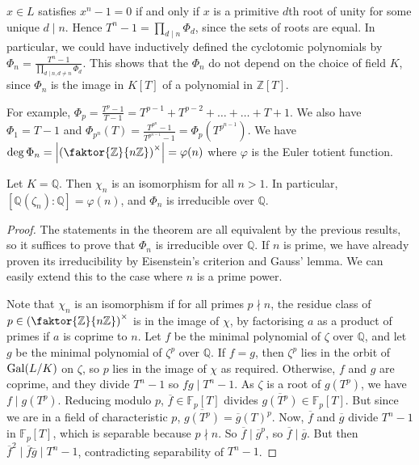 \( x \in L \) satisfies \( x^n - 1 = 0 \) if and only if \( x \) is a primitive \( d \)th root of unity for some unique \( d \mid n \).
Hence \( T^n - 1 = \prod_{d \mid n} \Phi_d \), since the sets of roots are equal.
In particular, we could have inductively defined the cyclotomic polynomials by \( \Phi_n = \frac{T^n - 1}{\prod_{d \mid n, d \neq n} \Phi_d} \).
This shows that the \( \Phi_n \) do not depend on the choice of field \( K \), since \( \Phi_n \) is the image in \( K[T] \) of a polynomial in \( \mathbb Z[T] \).

For example, \( \Phi_p = \frac{T^p - 1}{T - 1} = T^{p-1} + T^{p-2} + \dots + \dots + T + 1 \).
We also have \( \Phi_1 = T - 1 \) and \( \Phi_{p^n}(T) = \frac{T^{p^n} - 1}{T^{p^{n-1}} - 1} = \Phi_p(T^{p^{n-1}}) \).
We have \( \deg \Phi_n = \abs{\qty(\faktor{\mathbb Z}{n\mathbb Z})^\times} = \varphi(n) \) where \( \varphi \) is the Euler totient function.
\begin{theorem}[rationals]
	Let \( K = \mathbb Q \).
	Then \( \chi_n \) is an isomorphism for all \( n > 1 \).
	In particular, \( [\mathbb Q(\zeta_n) : \mathbb Q] = \varphi(n) \), and \( \Phi_n \) is irreducible over \( \mathbb Q \).
\end{theorem}
\begin{proof}
	The statements in the theorem are all equivalent by the previous results, so it suffices to prove that \( \Phi_n \) is irreducible over \( \mathbb Q \).
	If \( n \) is prime, we have already proven its irreducibility by Eisenstein's criterion and Gauss' lemma.
	We can easily extend this to the case where \( n \) is a prime power.

	Note that \( \chi_n \) is an isomorphism if for all primes \( p \nmid n \), the residue class of \( p \in \qty(\faktor{\mathbb Z}{n\mathbb Z})^\times \) is in the image of \( \chi \), by factorising \( a \) as a product of primes if \( a \) is coprime to \( n \).
	Let \( f \) be the minimal polynomial of \( \zeta \) over \( \mathbb Q \), and let \( g \) be the minimal polynomial of \( \zeta^p \) over \( \mathbb Q \).
	If \( f = g \), then \( \zeta^p \) lies in the orbit of \( \operatorname{Gal}(L/K) \) on \( \zeta \), so \( p \) lies in the image of \( \chi \) as required.
	Otherwise, \( f \) and \( g \) are coprime, and they divide \( T^n - 1 \) so \( fg \mid T^n - 1 \).
	As \( \zeta \) is a root of \( g(T^p) \), we have \( f \mid g(T^p) \).
	Reducing modulo \( p \), \( \overline f \in \mathbb F_p[T] \) divides \( \overline{g(T^p)} \in \mathbb F_p[T] \).
	But since we are in a field of characteristic \( p \), \( \overline{g(T^p)} = \overline g(T)^p \).
	Now, \( \overline f \) and \( \overline g \) divide \( T^n - 1 \) in \( \mathbb F_p[T] \), which is separable because \( p \nmid n \).
	So \( \overline f \mid \overline g^p \), so \( \overline f \mid \overline g \).
	But then \( \overline f^2 \mid \overline f \overline g \mid T^n - 1 \), contradicting separability of \( T^n - 1 \).
\end{proof}
